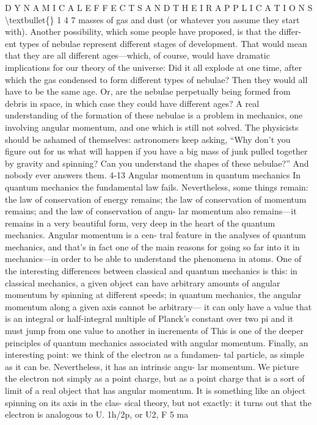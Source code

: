 \documentclass[10pt,oneside]{article}
\begin{document}
D Y N A M I C A L  E F F E C T S  A N D  T H E I R  A P P L I C A T I O N S \textbackslash{}textbullet\{\} 1 4 7 masses of gas and dust (or whatever you assume they start with). Another possibility, which some people have proposed, is that the differ- ent types of nebulae represent different stages of development. That would mean that they are all different ages---which, of course, would have dramatic implications for our theory of the universe: Did it all explode at one time, after which the gas condensed to form different types of nebulae? Then they would all have to be the same age. Or, are the nebulae perpetually being formed from debris in space, in which case they could have different ages? A real understanding of the formation of these nebulae is a problem in mechanics, one involving angular momentum, and one which is still not solved. The physicists should be ashamed of themselves: astronomers keep asking, “Why don’t you figure out for us what will happen if you have a big mass of junk pulled together by gravity and spinning? Can you understand the shapes of these nebulae?” And nobody ever answers them. 4-13 Angular momentum in quantum mechanics In quantum mechanics the fundamental law fails. Nevertheless, some things remain: the law of conservation of energy remains; the law of conservation of momentum remains; and the law of conservation of angu- lar momentum also remains---it remains in a very beautiful form, very deep in the heart of the quantum mechanics. Angular momentum is a cen- tral feature in the analyses of quantum mechanics, and that’s in fact one of the main reasons for going so far into it in mechanics---in order to be able to understand the phenomena in atoms. One of the interesting differences between classical and quantum mechanics is this: in classical mechanics, a given object can have arbitrary amounts of angular momentum by spinning at different speeds; in quantum mechanics, the angular momentum along a given axis cannot be arbitrary--- it can only have a value that is an integral or half-integral multiple of Planck’s constant over two pi and it must jump from one value to another in increments of This is one of the deeper principles of quantum mechanics associated with angular momentum. Finally, an interesting point: we think of the electron as a fundamen- tal particle, as simple as it can be. Nevertheless, it has an intrinsic angu- lar momentum. We picture the electron not simply as a point charge, but as a point charge that is a sort of limit of a real object that has angular momentum. It is something like an object spinning on its axis in the clas- sical theory, but not exactly: it turns out that the electron is analogous to U. 1h/2p, or U2, F 5 ma\par
\end{document}
